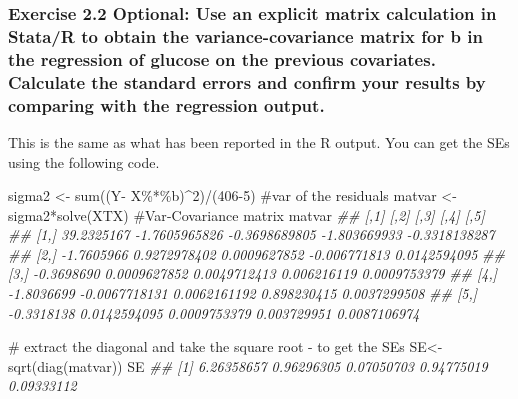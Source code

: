 \documentclass[
  letterpaper,
  DIV=11,
  numbers=noendperiod]{scrreprt}
\newenvironment{Shaded}{\begin{snugshade}}{\end{snugshade}}
\newcommand{\CommentTok}[1]{\textcolor[rgb]{0.37,0.37,0.37}{#1}}
\newcommand{\DecValTok}[1]{\textcolor[rgb]{0.68,0.00,0.00}{#1}}
\newcommand{\DocumentationTok}[1]{\textcolor[rgb]{0.37,0.37,0.37}{\textit{#1}}}
\newcommand{\FunctionTok}[1]{\textcolor[rgb]{0.28,0.35,0.67}{#1}}
\newcommand{\NormalTok}[1]{\textcolor[rgb]{0.00,0.23,0.31}{#1}}
\newcommand{\OtherTok}[1]{\textcolor[rgb]{0.00,0.23,0.31}{#1}}
\newcommand{\SpecialCharTok}[1]{\textcolor[rgb]{0.37,0.37,0.37}{#1}}
\begin{document}
\subsubsection*{Exercise 2.2 Optional: Use an explicit matrix
calculation in Stata/R to obtain the variance-covariance matrix for b in
the regression of glucose on the previous covariates. Calculate the
standard errors and confirm your results by comparing with the
regression
output.}\label{exercise-2.2-optional-use-an-explicit-matrix-calculation-in-statar-to-obtain-the-variance-covariance-matrix-for-b-in-the-regression-of-glucose-on-the-previous-covariates.-calculate-the-standard-errors-and-confirm-your-results-by-comparing-with-the-regression-output.}

This is the same as what has been reported in the R output. You can get
the SEs using the following code.

\begin{Shaded}
\begin{Highlighting}[]

\NormalTok{sigma2 }\OtherTok{\textless{}{-}} \FunctionTok{sum}\NormalTok{((Y}\SpecialCharTok{{-}}\NormalTok{ X}\SpecialCharTok{\%*\%}\NormalTok{b)}\SpecialCharTok{\^{}}\DecValTok{2}\NormalTok{)}\SpecialCharTok{/}\NormalTok{(}\DecValTok{406{-}5}\NormalTok{) }\CommentTok{\#var of the residuals}
\NormalTok{matvar }\OtherTok{\textless{}{-}}\NormalTok{ sigma2}\SpecialCharTok{*}\FunctionTok{solve}\NormalTok{(XTX)     }\CommentTok{\#Var{-}Covariance matrix   }
\NormalTok{matvar}
\DocumentationTok{\#\#            [,1]          [,2]          [,3]         [,4]          [,5]}
\DocumentationTok{\#\# [1,] 39.2325167 {-}1.7605965826 {-}0.3698689805 {-}1.803669933 {-}0.3318138287}
\DocumentationTok{\#\# [2,] {-}1.7605966  0.9272978402  0.0009627852 {-}0.006771813  0.0142594095}
\DocumentationTok{\#\# [3,] {-}0.3698690  0.0009627852  0.0049712413  0.006216119  0.0009753379}
\DocumentationTok{\#\# [4,] {-}1.8036699 {-}0.0067718131  0.0062161192  0.898230415  0.0037299508}
\DocumentationTok{\#\# [5,] {-}0.3318138  0.0142594095  0.0009753379  0.003729951  0.0087106974}

\CommentTok{\# extract the diagonal and take the square root {-} to get the SEs}
\NormalTok{SE}\OtherTok{\textless{}{-}}\FunctionTok{sqrt}\NormalTok{(}\FunctionTok{diag}\NormalTok{(matvar))}
\NormalTok{SE}
\DocumentationTok{\#\# [1] 6.26358657 0.96296305 0.07050703 0.94775019 0.09333112}
\end{Highlighting}
\end{Shaded}
\end{document}
